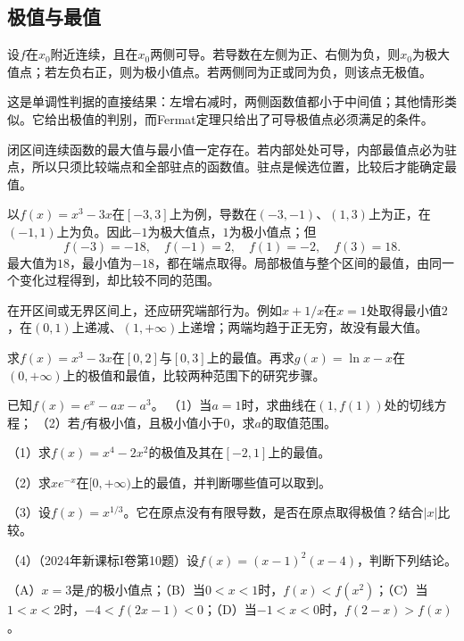 \subsection{极值与最值}

\begingroup
\setlength{\parskip}{3pt}
\setlength{\abovedisplayskip}{10pt}
\setlength{\belowdisplayskip}{10pt}

\begin{proposition}\label{prop:calculus-first-derivative-test}
设\(f\)在\(x_0\)附近连续，且在\(x_0\)两侧可导。若导数在左侧为正、右侧为负，则\(x_0\)为极大值点；若左负右正，则为极小值点。若两侧同为正或同为负，则该点无极值。
\end{proposition}

这是单调性判据的直接结果：左增右减时，两侧函数值都小于中间值；其他情形类似。它给出极值的判别，而Fermat定理只给出了可导极值点必须满足的条件。

闭区间连续函数的最大值与最小值一定存在。若内部处处可导，内部最值点必为驻点，所以只须比较端点和全部驻点的函数值。驻点是候选位置，比较后才能确定最值。

以\(f(x)=x^3-3x\)在\([-3,3]\)上为例，导数在\((-3,-1)\)、\((1,3)\)上为正，在\((-1,1)\)上为负。因此\(-1\)为极大值点，\(1\)为极小值点；但
\begin{equation*}
 f(-3)=-18,\quad f(-1)=2,\quad f(1)=-2,\quad f(3)=18.
\end{equation*}
最大值为\(18\)，最小值为\(-18\)，都在端点取得。局部极值与整个区间的最值，由同一个变化过程得到，却比较不同的范围。

在开区间或无界区间上，还应研究端部行为。例如\(x+1/x\)在\(x=1\)处取得最小值\(2\)，在\((0,1)\)上递减、\((1,+\infty)\)上递增；两端均趋于正无穷，故没有最大值。

\begin{example}
求\(f(x)=x^3-3x\)在\([0,2]\)与\([0,3]\)上的最值。再求\(g(x)=\ln x-x\)在\((0,+\infty)\)上的极值和最值，比较两种范围下的研究步骤。
\end{example}

\begin{example}[2024年新课标II卷第16题]
已知\(f(x)=e^x-ax-a^3\)。
（1）当\(a=1\)时，求曲线在\((1,f(1))\)处的切线方程；
（2）若\(f\)有极小值，且极小值小于\(0\)，求\(a\)的取值范围。
\end{example}

\begin{exercise}
\mbox{}\par\nobreak

（1）求\(f(x)=x^4-2x^2\)的极值及其在\([-2,1]\)上的最值。

（2）求\(x e^{-x}\)在\([0,+\infty)\)上的最值，并判断哪些值可以取到。

（3）设\(f(x)=x^{1/3}\)。它在原点没有有限导数，是否在原点取得极值？结合\(|x|\)比较。

\begin{samepage}
（4）（2024年新课标I卷第10题）设\(f(x)=(x-1)^2(x-4)\)，判断下列结论。

（A）\(x=3\)是\(f\)的极小值点；（B）当\(0<x<1\)时，\(f(x)<f(x^2)\)；（C）当\(1<x<2\)时，\(-4<f(2x-1)<0\)；（D）当\(-1<x<0\)时，\(f(2-x)>f(x)\)。
\par
\end{samepage}
\end{exercise}
\endgroup

